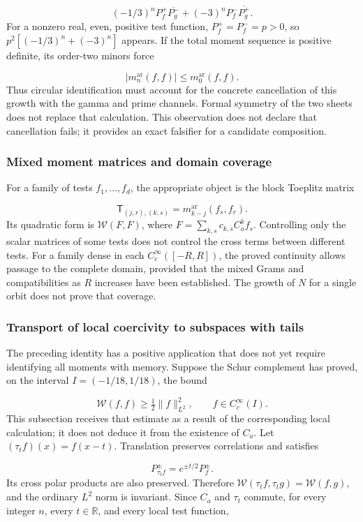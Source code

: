 \[
(-1/3)^nP_f^+\overline{P_g^-}
+(-3)^nP_f^-\overline{P_g^+}.
\]
For a nonzero real, even, positive test function, \(P_f^+=P_f^-=p>0\), so \(p^2[(-1/3)^n+(-3)^n]\) appears. If the total moment sequence is positive definite, its order-two minors force

\[
|m_n^{\mathrm{ar}}(f,f)|\le m_0^{\mathrm{ar}}(f,f).
\]
Thus circular identification must account for the concrete cancellation of this growth with the gamma and prime channels. Formal symmetry of the two sheets does not replace that calculation. This observation does not declare that cancellation fails; it provides an exact falsifier for a candidate composition.


\subsubsection{Mixed moment matrices and domain coverage}
\label{viii:tm-add-m6-2}
For a family of tests \(f_1,\ldots,f_d\), the appropriate object is the block Toeplitz matrix

\[
\mathsf T_{(j,r),(k,s)}
=m_{k-j}^{\mathrm{ar}}(f_s,f_r).
\]
Its quadratic form is \(\mathscr W(F,F)\), where \(F=\sum_{k,s}c_{k,s}C_a^k f_s\). Controlling only the scalar matrices of some tests does not control the cross terms between different tests. For a family dense in each \(C_c^\infty([-R,R])\), the proved continuity allows passage to the complete domain, provided that the mixed Grams and compatibilities as \(R\) increases have been established. The growth of \(N\) for a single orbit does not prove that coverage.


\subsubsection{Transport of local coercivity to subspaces with tails}
\label{viii:tm-add-m6-3}
\label{viii:tm-add:familias-transportadas}
The preceding identity has a positive application that does not yet require identifying all moments with memory. Suppose the Schur complement has proved, on the interval \(I=(-1/18,1/18)\), the bound

\[
\mathscr W(f,f)\geq\tfrac12\|f\|_{L^2}^2,
\qquad f\in C_c^\infty(I).
\]
This subsection receives that estimate as a result of the corresponding local calculation; it does not deduce it from the existence of \(C_a\). Let \((\tau_t f)(x)=f(x-t)\). Translation preserves correlations and satisfies

\[
P_{\tau_t f}^{\pm}=e^{\pm t/2}P_f^{\pm}.
\]
Its cross polar products are also preserved. Therefore \(\mathscr W(\tau_t f,\tau_t g)=\mathscr W(f,g)\), and the ordinary \(L^2\) norm is invariant. Since \(C_a\) and \(\tau_t\) commute, for every integer \(n\), every \(t\in\mathbb R\), and every local test function,

